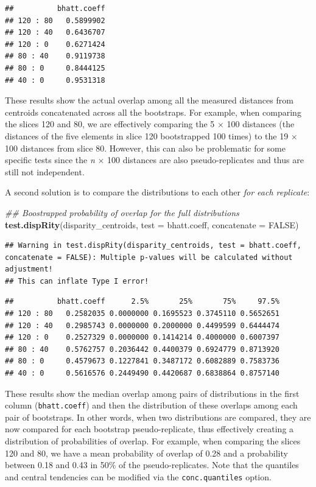 \documentclass[]{book}
\newenvironment{Shaded}{\begin{snugshade}}{\end{snugshade}}
\newcommand{\CommentTok}[1]{\textcolor[rgb]{0.56,0.35,0.01}{\textit{#1}}}
\newcommand{\DataTypeTok}[1]{\textcolor[rgb]{0.13,0.29,0.53}{#1}}
\newcommand{\KeywordTok}[1]{\textcolor[rgb]{0.13,0.29,0.53}{\textbf{#1}}}
\newcommand{\NormalTok}[1]{#1}
\newcommand{\OtherTok}[1]{\textcolor[rgb]{0.56,0.35,0.01}{#1}}
\begin{document}
\begin{verbatim}
##          bhatt.coeff
## 120 : 80   0.5899902
## 120 : 40   0.6436707
## 120 : 0    0.6271424
## 80 : 40    0.9119738
## 80 : 0     0.8444125
## 40 : 0     0.9531318
\end{verbatim}

These results show the actual overlap among all the measured distances from centroids concatenated across all the bootstraps.
For example, when comparing the slices 120 and 80, we are effectively comparing the 5 \(\times\) 100 distances (the distances of the five elements in slice 120 bootstrapped 100 times) to the 19 \(\times\) 100 distances from slice 80.
However, this can also be problematic for some specific tests since the \emph{n} \(\times\) 100 distances are also pseudo-replicates and thus are still not independent.

A second solution is to compare the distributions to each other \emph{for each replicate}:

\begin{Shaded}
\begin{Highlighting}[]
\CommentTok{## Boostrapped probability of overlap for the full distributions}
\KeywordTok{test.dispRity}\NormalTok{(disparity_centroids, }\DataTypeTok{test =}\NormalTok{ bhatt.coeff,}
              \DataTypeTok{concatenate =} \OtherTok{FALSE}\NormalTok{)}
\end{Highlighting}
\end{Shaded}

\begin{verbatim}
## Warning in test.dispRity(disparity_centroids, test = bhatt.coeff, concatenate = FALSE): Multiple p-values will be calculated without adjustment!
## This can inflate Type I error!
\end{verbatim}

\begin{verbatim}
##          bhatt.coeff      2.5%       25%       75%     97.5%
## 120 : 80   0.2582035 0.0000000 0.1695523 0.3745110 0.5652651
## 120 : 40   0.2985743 0.0000000 0.2000000 0.4499599 0.6444474
## 120 : 0    0.2527329 0.0000000 0.1414214 0.4000000 0.6007397
## 80 : 40    0.5762757 0.2036442 0.4400379 0.6924779 0.8713920
## 80 : 0     0.4579673 0.1227841 0.3487172 0.6082889 0.7583736
## 40 : 0     0.5616576 0.2449490 0.4420687 0.6838864 0.8757140
\end{verbatim}

These results show the median overlap among pairs of distributions in the first column (\texttt{bhatt.coeff}) and then the distribution of these overlaps among each pair of bootstraps.
In other words, when two distributions are compared, they are now compared for each bootstrap pseudo-replicate, thus effectively creating a distribution of probabilities of overlap.
For example, when comparing the slices 120 and 80, we have a mean probability of overlap of 0.28 and a probability between 0.18 and 0.43 in 50\% of the pseudo-replicates.
Note that the quantiles and central tendencies can be modified via the \texttt{conc.quantiles} option.
\end{document}
